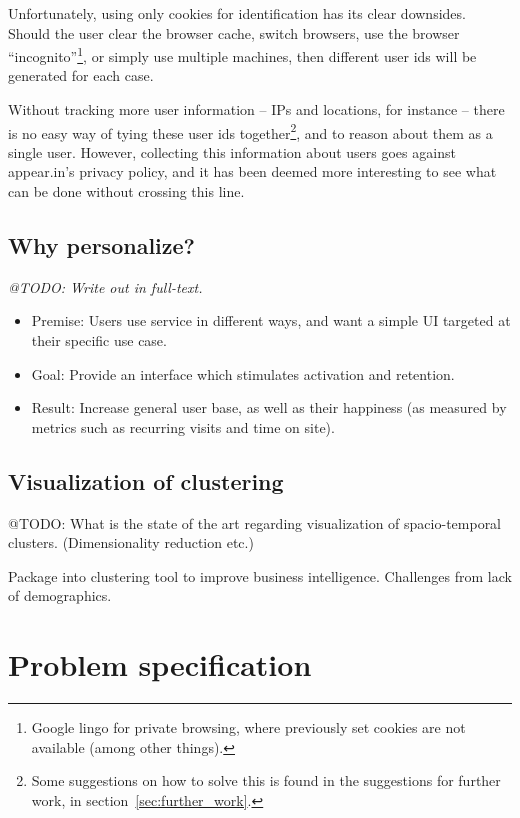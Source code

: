 Unfortunately, using only cookies for identification has its clear downsides. Should the user clear the browser cache, switch browsers, use the browser ``incognito''\footnote{Google lingo for private browsing, where previously set cookies are not available (among other things).}, or simply use multiple machines, then different user ids will be generated for each case.

Without tracking more user information -- IPs and locations, for instance -- there is no easy way of tying these user ids together\footnote{Some suggestions on how to solve this is found in the suggestions for further work, in section~\ref{sec:further_work}.}, and to reason about them as a single user. However, collecting this information about users goes against appear.in's privacy policy, and it has been deemed more interesting to see what can be done without crossing this line.

\subsection{Why personalize?} %
\label{sub:why_personalize}

\emph{@TODO: Write out in full-text.}

\begin{itemize}
  \item Premise: Users use service in different ways, and want a simple UI targeted at their specific use case.
  \item Goal: Provide an interface which stimulates activation and retention.
  \item Result: Increase general user base, as well as their happiness (as measured by metrics such as recurring visits and time on site).
\end{itemize}


\subsection{Visualization of clustering}

@TODO: What is the state of the art regarding visualization of spacio-temporal clusters. (Dimensionality reduction etc.)

Package into clustering tool to improve business intelligence. Challenges from lack of demographics.

\section{Problem specification}
\label{sec:problem_specification}

